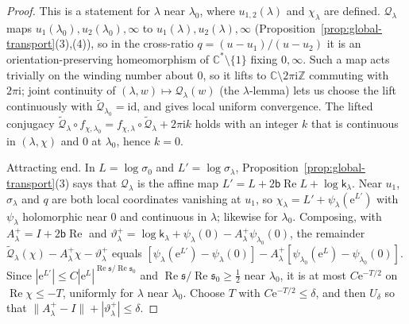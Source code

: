 \documentclass[11pt]{amsart}
\theoremstyle{definition}
\newcommand{\eee}{\mathrm{e}}
\newcommand{\ii}{\mathrm{i}}
\begin{document}
\begin{proof}
This is a statement for $\lambda$ near $\lambda_0$, where $u_{1,2}(\lambda)$ and $\chi_\lambda$ are defined.
$\mathcal Q_\lambda$ maps $u_1(\lambda_0),u_2(\lambda_0),\infty$ to $u_1(\lambda),u_2(\lambda),\infty$
(Proposition~\ref{prop:global-transport}(3),(4)), so in the cross-ratio
$q=(u-u_1)/(u-u_2)$ it is an orientation-preserving homeomorphism of
$\mathbb C^*\setminus\{1\}$ fixing $0,\infty$.  Such a map acts trivially on the winding
number about $0$, so it lifts to $\mathbb C\setminus2\pi\ii\mathbb Z$ commuting with $2\pi\ii$; joint
continuity of $(\lambda,w)\mapsto \mathcal Q_\lambda(w)$ (the $\lambda$-lemma) lets us choose the lift
continuously with $\tilde{\mathcal Q}_{\lambda_0}=\mathrm{id}$, and gives local uniform convergence.  The
lifted conjugacy $\tilde{\mathcal Q}_\lambda\circ f_{\chi,\lambda_0}=f_{\chi,\lambda}\circ\tilde{\mathcal Q}_\lambda+2\pi\ii k$ holds with an
integer $k$ that is continuous in $(\lambda,\chi)$ and $0$ at $\lambda_0$, hence $k=0$.

Attracting end.  In $L=\log\sigma_0$ and $L'=\log\sigma_\lambda$,
Proposition~\ref{prop:global-transport}(3) says that $\mathcal Q_\lambda$ is the affine map
$L'=L+2\mathsf b\operatorname{Re}L+\log \mathsf k_\lambda$.  Near $u_1$, $\sigma_\lambda$ and $q$ are both local coordinates
vanishing at $u_1$, so $\chi_\lambda=L'+\psi_\lambda(\eee^{L'})$ with $\psi_\lambda$ holomorphic near $0$ and
continuous in $\lambda$; likewise for $\lambda_0$.  Composing, with $A^+_\lambda=I+2\mathsf b\operatorname{Re}$ and
$\vartheta^+_\lambda=\log\mathsf k_\lambda+\psi_\lambda(0)-A^+_\lambda\psi_{\lambda_0}(0)$, the remainder
$\tilde{\mathcal Q}_\lambda(\chi)-A^+_\lambda\chi-\vartheta^+_\lambda$ equals
$[\psi_\lambda(\eee^{L'})-\psi_\lambda(0)]-A^+_\lambda[\psi_{\lambda_0}(\eee^{L})-\psi_{\lambda_0}(0)]$.  Since
$|\eee^{L'}|\le C|\eee^{L}|^{\operatorname{Re}\mathfrak s/\operatorname{Re}\mathfrak s_0}$ and $\operatorname{Re}\mathfrak s/\operatorname{Re}\mathfrak s_0\ge\tfrac12$ near $\lambda_0$, it is
at most $C\eee^{-T/2}$ on $\operatorname{Re}\chi\le-T$, uniformly for $\lambda$ near $\lambda_0$.  Choose $T$ with
$C\eee^{-T/2}\le\delta$, and then $U_\delta$ so that $\|A^+_\lambda-I\|+|\vartheta^+_\lambda|\le\delta$.


\end{proof}
\end{document}

